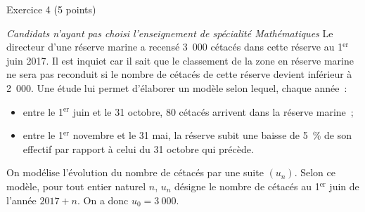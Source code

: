 
\begin{h2}Exercice 4 (5 points)\end{h2}
\smallbreak
\textit{Candidats n'ayant pas choisi l'enseignement de spécialité \og Mathématiques \fg{} }
\bigbreak
Le directeur d'une réserve marine a recensé 3~000 cétacés dans cette réserve au 1$^{\text{er}}$ juin 2017. Il est inquiet car il sait que le classement de la zone en \og réserve marine\fg{} ne sera pas reconduit si le nombre de cétacés de cette réserve devient inférieur à 2~000.
\smallbreak
Une étude lui permet d'élaborer un modèle selon lequel, chaque année~:
\begin{itemize}
     \item entre le 1$^{\text{er}}$ juin et le 31 octobre, 80 cétacés arrivent dans la réserve marine~;
     \item entre le 1$^{\text{er}}$ novembre et le 31 mai, la réserve subit une baisse de 5~\% de son effectif par rapport à celui du 31 octobre qui précède.
\end{itemize}
On modélise l'évolution du nombre de cétacés par une suite $(u_n)$. Selon ce modèle, pour tout entier naturel $n$, $u_n$ désigne le nombre de cétacés au 1$^{\text{er}}$ juin de l'année $2017+n$. On a donc $u_0=3~000$.
